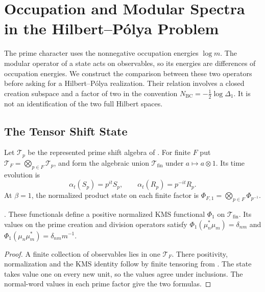 \chapter{Occupation and Modular Spectra in the Hilbert--P\'olya Problem}
\label{v4-arith:w5-b:hp-operator}

The prime character uses the nonnegative occupation energies
$\log m$. The modular operator of a state acts on observables,
so its energies are differences of occupation energies. We
construct the comparison between these two operators before
asking for a Hilbert--P\'olya realization. Their relation involves
a closed creation subspace and a factor of two in the convention
$N_{\mathrm{BC}}=-\tfrac12\log\Delta_1$. It is not an
identification of the two full Hilbert spaces.

\section{The Tensor Shift State}
\label{v4-arith:w5-b:bc-setup}

\begin{definition}
\label{v4-arith:w5-b:def:bc-algebra}
Let $\mathcal T_p$ be the represented prime shift algebra of
. For finite $F$ put
$\mathcal T_F=\bigotimes_{p\in F}\mathcal T_p$, and form the
algebraic union $\mathcal T_{\mathrm{fin}}$ under
$a\mapsto a\otimes1$. Its time evolution is
\begin{equation}
 \alpha_t(S_p)=p^{it}S_p,\qquad
 \alpha_t(R_p)=p^{-it}R_p.
 \label{v4-arith:w5-b:eq:bc-time}
\end{equation}
At $\beta=1$, the normalized product state on each finite factor
is $\Phi_{F,1}=\bigotimes_{p\in F}\Phi_{p^{-1}}$.
\end{definition}

\begin{lemma}
\label{v4-arith:w5-b:lem:kms-1}
\ClaimStatusProvedHere. These functionals define a positive
normalized KMS functional $\Phi_1$ on $\mathcal T_{\mathrm{fin}}$.
Its values on the prime creation and division operators satisfy
$\Phi_1(\mu_n^*\mu_m)=\delta_{nm}$ and
$\Phi_1(\mu_n\mu_m^*)=\delta_{nm}m^{-1}$.
\end{lemma}

\begin{proof}
A finite collection of observables lies in one $\mathcal T_F$.
There positivity, normalization and the KMS identity follow by
finite tensoring from .
The state takes value one on every new unit, so the values agree
under inclusions. The normal-word values in each prime factor
give the two formulas.
\end{proof}

